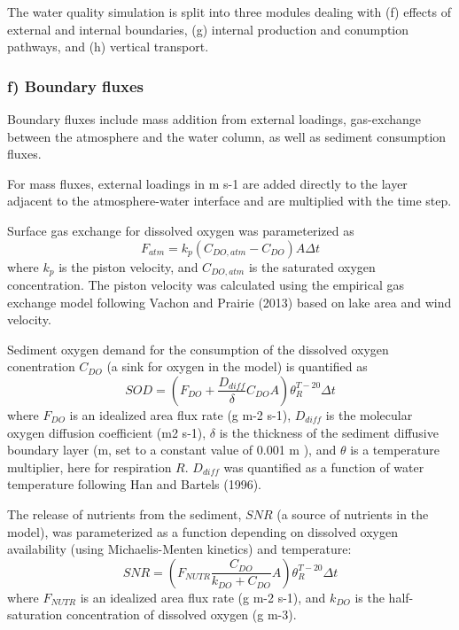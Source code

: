 \documentclass[
  letterpaper,
  DIV=11,
  numbers=noendperiod]{scrartcl}
\begin{document}
The water quality simulation is split into three modules dealing with
(f) effects of external and internal boundaries, (g) internal production
and conumption pathways, and (h) vertical transport.

\hypertarget{f-boundary-fluxes}{%
\subsubsection{f) Boundary fluxes}\label{f-boundary-fluxes}}

Boundary fluxes include mass addition from external loadings,
gas-exchange between the atmosphere and the water column, as well as
sediment consumption fluxes.

For mass fluxes, external loadings in m s-1 are added directly to the
layer adjacent to the atmosphere-water interface and are multiplied with
the time step.

Surface gas exchange for dissolved oxygen was parameterized as \[
F_{atm} = k_{p} (C_{DO, atm} - C_{DO}) A \Delta t
\] where \(k_{p}\) is the piston velocity, and \(C_{DO, atm}\) is the
saturated oxygen concentration. The piston velocity was calculated using
the empirical gas exchange model following Vachon and Prairie (2013)
based on lake area and wind velocity.

Sediment oxygen demand for the consumption of the dissolved oxygen
conentration \(C_{DO}\) (a sink for oxygen in the model) is quantified
as \[
SOD = (F_{DO}  + \frac{D_{diff}}{\delta} C_{DO} A ) \theta_{R}^{T-20} \Delta t
\] where \(F_{DO}\) is an idealized area flux rate (g m-2 s-1),
\(D_{diff}\) is the molecular oxygen diffusion coefficient (m2 s-1),
\(\delta\) is the thickness of the sediment diffusive boundary layer (m,
set to a constant value of 0.001 m ), and \(\theta\) is a temperature
multiplier, here for respiration \(R\). \(D_{diff}\) was quantified as a
function of water temperature following Han and Bartels (1996).

The release of nutrients from the sediment, \(SNR\) (a source of
nutrients in the model), was parameterized as a function depending on
dissolved oxygen availability (using Michaelis-Menten kinetics) and
temperature: \[
SNR = (F_{NUTR} \frac{C_{DO}}{k_{DO} + C_{DO}} A)\theta_{R}^{T-20} \Delta t
\] where \(F_{NUTR}\) is an idealized area flux rate (g m-2 s-1), and
\(k_{DO}\) is the half-saturation concentration of dissolved oxygen (g
m-3).
\end{document}
